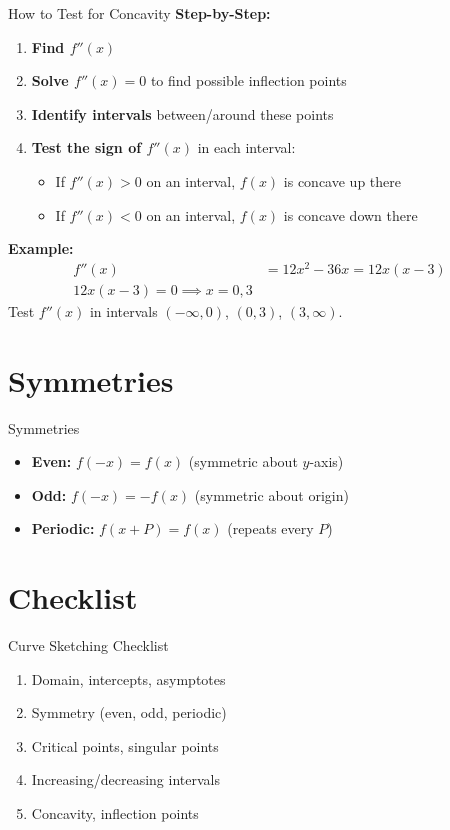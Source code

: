 \documentclass[aspectratio=169]{beamer}
\begin{document}
\begin{frame}{How to Test for Concavity}
\textbf{Step-by-Step:}
\begin{enumerate}
    \item \textbf{Find $f''(x)$}
    \item \textbf{Solve $f''(x) = 0$} to find possible inflection points
    \item \textbf{Identify intervals} between/around these points
    \item \textbf{Test the sign of $f''(x)$} in each interval:
    \begin{itemize}
        \item If $f''(x) > 0$ on an interval, $f(x)$ is concave up there
        \item If $f''(x) < 0$ on an interval, $f(x)$ is concave down there
    \end{itemize}
\end{enumerate}
\textbf{Example:}
\[
\begin{aligned}
    f''(x) &= 12x^2 - 36x = 12x(x-3) \\
    12x(x-3) = 0 \implies x = 0, 3
\end{aligned}
\]
Test $f''(x)$ in intervals $(-\infty, 0)$, $(0, 3)$, $(3, \infty)$.
\end{frame}

\section{Symmetries}

\begin{frame}{Symmetries}
\begin{itemize}
    \item \textbf{Even:} $f(-x) = f(x)$ (symmetric about $y$-axis)
    \item \textbf{Odd:} $f(-x) = -f(x)$ (symmetric about origin)
    \item \textbf{Periodic:} $f(x+P) = f(x)$ (repeats every $P$)
\end{itemize}
\end{frame}

\section{Checklist}

\begin{frame}{Curve Sketching Checklist}
\begin{enumerate}
    \item Domain, intercepts, asymptotes
    \item Symmetry (even, odd, periodic)
    \item Critical points, singular points
    \item Increasing/decreasing intervals
    \item Concavity, inflection points
\end{enumerate}
\end{frame}
\end{document}
